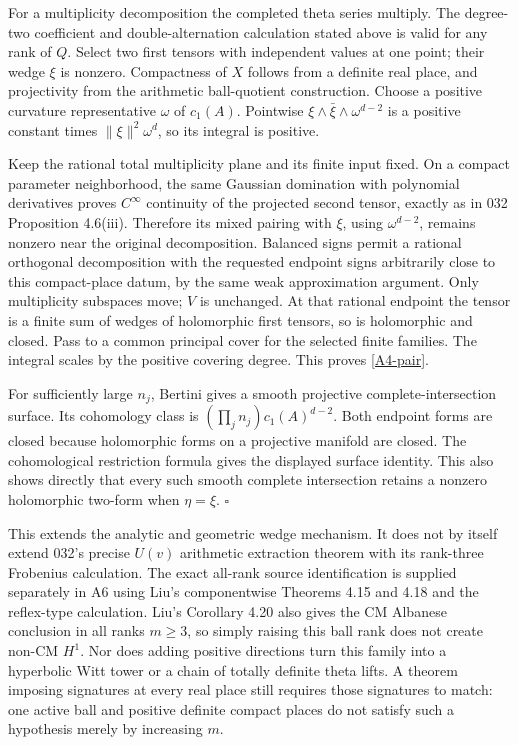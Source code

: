 For a multiplicity decomposition the completed theta series multiply.
The degree-two coefficient and double-alternation calculation stated
above is valid for any rank of $Q$. Select two first tensors with
independent values at one point; their wedge $\xi$ is nonzero.
Compactness of $X$ follows from a definite real place, and projectivity
from the arithmetic ball-quotient construction. Choose a positive
curvature representative $\omega$ of $c_1(A)$. Pointwise
$\xi\wedge\bar\xi\wedge\omega^{d-2}$ is a positive constant
times $\|\xi\|^2\omega^d$, so its integral is positive.

Keep the rational total multiplicity plane and its finite input fixed.
On a compact parameter neighborhood, the same Gaussian domination
with polynomial derivatives proves $C^\infty$ continuity of the
projected second tensor, exactly as in 032 Proposition 4.6(iii).
Therefore its mixed pairing with $\xi$, using $\omega^{d-2}$, remains
nonzero near the original decomposition. Balanced signs permit a
rational orthogonal decomposition with the requested endpoint signs
arbitrarily close to this compact-place datum, by the same weak
approximation argument. Only multiplicity subspaces move; $V$ is
unchanged. At that rational endpoint the tensor is a finite sum of
wedges of holomorphic first tensors, so is holomorphic and closed.
Pass to a common principal cover for the selected finite families.
The integral scales by the positive covering degree. This proves
\eqref{A4-pair}.

For sufficiently large $n_j$, Bertini gives a smooth projective
complete-intersection surface. Its cohomology class is
$(\prod_jn_j)c_1(A)^{d-2}$. Both endpoint forms are closed because
holomorphic forms on a projective manifold are closed. The
cohomological restriction formula gives the displayed surface
identity. This also shows directly that every such smooth complete
intersection retains a nonzero holomorphic two-form when $\eta=\xi$.
$\square$

This extends the analytic and geometric wedge mechanism. It does not
by itself extend 032's precise $U(v)$ arithmetic extraction theorem
with its rank-three Frobenius calculation. The exact all-rank source
identification is supplied separately in A6 using Liu's componentwise
Theorems 4.15 and 4.18 and the reflex-type calculation. Liu's
Corollary 4.20 also gives the CM Albanese conclusion in
all ranks $m\geq3$, so simply raising this ball rank does not create
non-CM $H^1$. Nor does adding positive directions turn this family
into a hyperbolic Witt tower or a chain of totally definite theta
lifts. A theorem imposing signatures at every real place still
requires those signatures to match: one active ball and positive
definite compact places do not satisfy such a hypothesis merely by
increasing $m$.

